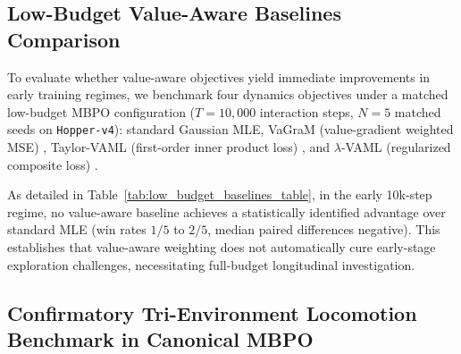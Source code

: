 \documentclass[journal,10pt,twocolumn]{IEEEtran}
\begin{document}
\subsection{Low-Budget Value-Aware Baselines Comparison}
\label{subsec:low_budget_baselines}

To evaluate whether value-aware objectives yield immediate improvements in early training regimes, we benchmark four dynamics objectives under a matched low-budget MBPO configuration ($T = 10,000$ interaction steps, $N=5$ matched seeds on \texttt{Hopper-v4}): standard Gaussian MLE, VaGraM (value-gradient weighted MSE) \cite{voelcker2022value}, Taylor-VAML (first-order inner product loss) \cite{farahmand2017value}, and $\lambda$-VAML (regularized composite loss) \cite{voelcker2023lambda}.

\begin{table}[t]
\centering
\caption{Value-Aware Baselines on \texttt{Hopper-v4} at Low Interaction Budget ($T = 10,000$ Steps, $N=5$ Seeds).}
\label{tab:low_budget_baselines_table}
\end{table}

As detailed in Table~\ref{tab:low_budget_baselines_table}, in the early 10k-step regime, no value-aware baseline achieves a statistically identified advantage over standard MLE (win rates $1/5$ to $2/5$, median paired differences negative). This establishes that value-aware weighting does not automatically cure early-stage exploration challenges, necessitating full-budget longitudinal investigation.

\subsection{Confirmatory Tri-Environment Locomotion Benchmark in Canonical MBPO}
\label{subsec:tri_env_confirmatory_benchmark}
\end{document}
